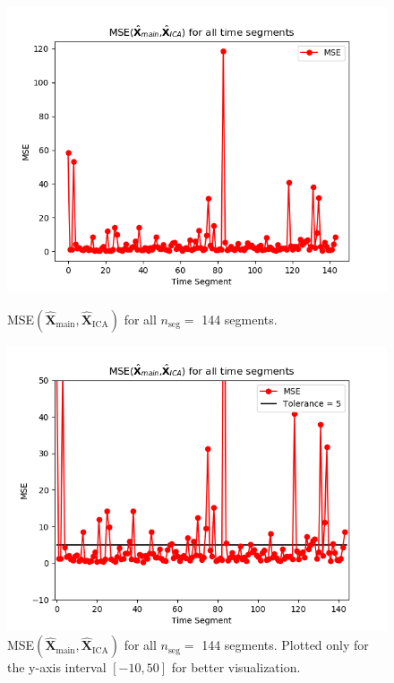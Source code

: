 \begin{figure}[H]
\begin{widepage}
    \begin{minipage}[t]{.45\textwidth}
		\centering
		\includegraphics[width=1\linewidth]{figures/ch_7/resultat/average_mse_third_removed_ica}
	\caption{MSE$\left(\hat{\mathbf{X}}_{\text{main}},\hat{\mathbf{X}}_{\text{ICA}}\right)$ for all $n_{\text{seg}} = $ 144 segments.}
	\label{fig:M<N_1}
    \end{minipage} 
\hspace{0.5cm}
    \begin{minipage}[t]{.45\textwidth}
        \centering
		\includegraphics[width=1\linewidth]{figures/ch_7/resultat/average_mse_third_removed_ica_zoom.png}
	\caption{MSE$\left(\hat{\mathbf{X}}_{\text{main}},\hat{\mathbf{X}}_{\text{ICA}}\right)$ for all $n_{\text{seg}} = $ 144 segments. Plotted only for the y-axis interval $[-10, 50]$ for better visualization.}
	\label{fig:M<N_1_2}
    \end{minipage}
\end{widepage}
\end{figure}
